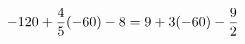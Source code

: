 \documentclass[preview]{standalone}
\begin{document}
\begin{align*}
\special{dvisvgm:raw <g id='unique000'>}-120 + \frac{4}{5} (-60) - 8 = 9 + 3(-60) - \frac{9}{2}\special{dvisvgm:raw </g>}
\end{align*}
\end{document}
